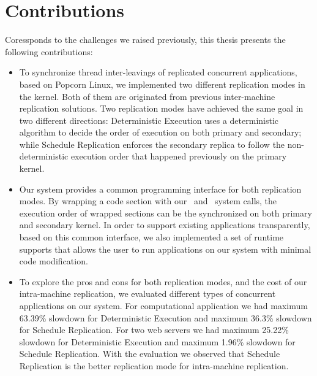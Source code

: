 \section{Contributions}

Coressponds to the challenges we raised previously, this thesis presents the following contributions:

\begin{itemize}
\item To synchronize thread inter-leavings of replicated concurrent applications, based on Popcorn Linux, we implemented two different replication modes in the kernel. Both of them are originated from previous inter-machine replication solutions. Two replication modes have achieved the same goal in two different directions: Deterministic Execution uses a deterministic algorithm to decide the order of execution on both primary and secondary; while Schedule Replication enforces the secondary replica to follow the non-deterministic execution order that happened previously on the primary kernel.

\item Our system provides a common programming interface for both replication modes. By wrapping a code section with our \detstart\ and \detend\ system calls, the execution order of wrapped sections can be the synchronized on both primary and secondary kernel. In order to support existing applications transparently, based on this common interface, we also implemented a set of runtime supports that allows the user to run applications on our system with minimal code modification.

\item To explore the pros and cons for both replication modes, and the cost of our intra-machine replication, we evaluated different types of concurrent applications on our system. For computational application we had maximum 63.39\% slowdown for Deterministic Execution and maximum 36.3\% slowdown for Schedule Replication. For two web servers we had maximum 25.22\% slowdown for Deterministic Execution and maximum 1.96\% slowdown for Schedule Replication. With the evaluation we observed that Schedule Replication is the better replication mode for intra-machine replication.

\end{itemize}

